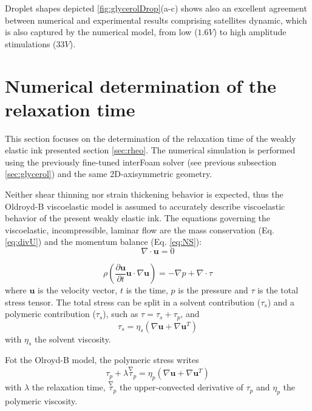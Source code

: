 \documentclass[onecolumn, 12pt]{asme2ej}
\begin{document}
Droplet shapes depicted \ref{fig:glycerolDrop}(a-c) shows also an excellent agreement between numerical and experimental results comprising satellites dynamic, which is also captured by the numerical model, from low ($1.6V$) to high amplitude stimulations ($33V$).


\section{Numerical determination of the relaxation time} \label{numericalDetermination}

This section focuses on the determination of the relaxation time of the weakly elastic ink presented section \ref{sec:rheo}. The numerical simulation  is performed using the previously fine-tuned interFoam solver (see previous subsection \ref{sec:glycerol}) and the same 2D-axisymmetric geometry. 

Neither shear thinning nor strain thickening behavior is expected, thus the Oldroyd-B viscoelastic model \cite{oldroyd1950formulation} is assumed to accurately describe viscoelastic behavior of the present weakly elastic ink. The equations governing the viscoelastic, incompressible, laminar flow are the mass conservation (Eq. \ref{eq:divU}) and the momentum balance (Eq. \ref{eq:NS}):
\begin{equation}\label{eq:divU}
    \nabla \cdot \mathbf{u} = 0
\end{equation}

\begin{equation}\label{eq:NS}
    \rho \left( \frac{\partial \mathbf{u}}{\partial t} \mathbf{u} \cdot \nabla \mathbf{u} \right) = -\nabla p + \nabla \cdot \tau
\end{equation}
where $\mathbf{u}$ is the velocity vector, $t$ is the time, $p$ is the pressure and $\tau$ is the total stress tensor. The total stress can be split in a solvent contribution ($\tau_s$) and a polymeric contribution ($\tau_s$), such as $\tau= \tau_s + \tau_p$, and 
\begin{equation}
    \tau_s= \eta_s\left(\nabla \mathbf{u}+ \nabla \mathbf{u}^T \right)
\end{equation}
with $\eta_s$ the solvent viscosity.

Fot the Olroyd-B model, the polymeric stress writes
\begin{equation}
    \tau_p +\lambda \overset{\nabla}{\tau}_p = \eta_p\left(\nabla \mathbf{u}+ \nabla \mathbf{u}^T \right)
\end{equation}
with $\lambda$ the relaxation time, $\overset{\nabla}{\tau}_p$ the upper-convected derivative of $\tau_p$ and $\eta_p$ the polymeric viscosity.
\end{document}
